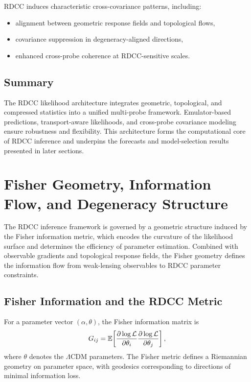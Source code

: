 \documentclass[11pt,a4paper]{article}
\begin{document}
RDCC induces characteristic cross-covariance patterns, including:

\begin{itemize}
    \item alignment between geometric response fields and topological flows,
    \item covariance suppression in degeneracy-aligned directions,
    \item enhanced cross-probe coherence at RDCC-sensitive scales.
\end{itemize}

\subsection{Summary}

The RDCC likelihood architecture integrates geometric, topological, and
compressed statistics into a unified multi-probe framework. Emulator-based
predictions, transport-aware likelihoods, and cross-probe covariance modeling
ensure robustness and flexibility. This architecture forms the computational core
of RDCC inference and underpins the forecasts and model-selection results
presented in later sections.


\section{Fisher Geometry, Information Flow, and Degeneracy Structure}

The RDCC inference framework is governed by a geometric structure induced by the
Fisher information metric, which encodes the curvature of the likelihood surface
and determines the efficiency of parameter estimation. Combined with observable
gradients and topological response fields, the Fisher geometry defines the
information flow from weak-lensing observables to RDCC parameter constraints.

\subsection{Fisher Information and the RDCC Metric}

For a parameter vector $(\alpha,\theta)$, the Fisher information matrix is
\begin{equation}
    G_{ij}
    =
    \mathbb{E}\!\left[
        \pdv{\log \mathcal{L}}{\theta_{i}}
        \pdv{\log \mathcal{L}}{\theta_{j}}
    \right],
\end{equation}
where $\theta$ denotes the $\Lambda$CDM parameters. The Fisher metric defines a
Riemannian geometry on parameter space, with geodesics corresponding to
directions of minimal information loss.
\end{document}

